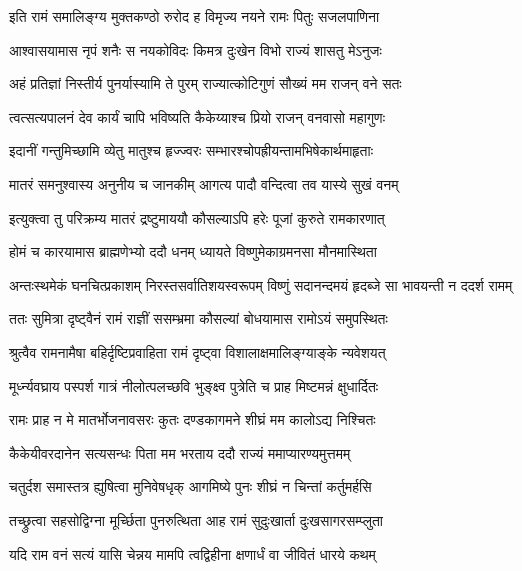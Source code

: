 \twolineshloka
{इति रामं समालिङ्ग्य मुक्तकण्ठो रुरोद ह}
{विमृज्य नयने रामः पितुः सजलपाणिना} %

\twolineshloka
{आश्वासयामास नृपं शनैः स नयकोविदः}
{किमत्र दुःखेन विभो राज्यं शासतु मेऽनुजः} %

\twolineshloka
{अहं प्रतिज्ञां निस्तीर्य पुनर्यास्यामि ते पुरम्}
{राज्यात्कोटिगुणं सौख्यं मम राजन् वने सतः} %

\twolineshloka
{त्वत्सत्यपालनं देव कार्यं चापि भविष्यति}
{कैकेय्याश्च प्रियो राजन् वनवासो महागुणः} %

\twolineshloka
{इदानीं गन्तुमिच्छामि व्येतु मातुश्च हृज्ज्वरः}
{सम्भारश्चोपह्रीयन्तामभिषेकार्थमाहृताः} %

\twolineshloka
{मातरं समनुश्वास्य अनुनीय च जानकीम्}
{आगत्य पादौ वन्दित्वा तव यास्ये सुखं वनम्} %

\twolineshloka
{इत्युक्त्वा तु परिक्रम्य मातरं द्रष्टुमाययौ}
{कौसल्याऽपि हरेः पूजां कुरुते रामकारणात्} %

\twolineshloka
{होमं च कारयामास ब्राह्मणेभ्यो ददौ धनम्}
{ध्यायते विष्णुमेकाग्रमनसा मौनमास्थिता} %

\fourlineindentedshloka
{अन्तःस्थमेकं घनचित्प्रकाशम्}
{निरस्तसर्वातिशयस्वरूपम्}
{विष्णुं सदानन्दमयं हृदब्जे}
{सा भावयन्ती न ददर्श रामम्} %





\twolineshloka
{ततः सुमित्रा दृष्ट्वैनं रामं राज्ञीं ससम्भ्रमा}
{कौसल्यां बोधयामास रामोऽयं समुपस्थितः} %

\twolineshloka
{श्रुत्वैव रामनामैषा बहिर्दृष्टिप्रवाहिता}
{रामं दृष्ट्वा विशालाक्षमालिङ्ग्याङ्के न्यवेशयत्} %

\twolineshloka
{मूर्ध्न्यवघ्राय पस्पर्श गात्रं नीलोत्पलच्छवि}
{भुङ्क्ष्व पुत्रेति च प्राह मिष्टमन्नं क्षुधार्दितः} %

\twolineshloka
{रामः प्राह न मे मातर्भोजनावसरः कुतः}
{दण्डकागमने शीघ्रं मम कालोऽद्य निश्चितः} %

\twolineshloka
{कैकेयीवरदानेन सत्यसन्धः पिता मम}
{भरताय ददौ राज्यं ममाप्यारण्यमुत्तमम्} %

\twolineshloka
{चतुर्दश समास्तत्र ह्युषित्वा मुनिवेषधृक्}
{आगमिष्ये पुनः शीघ्रं न चिन्तां कर्तुमर्हसि} %

\twolineshloka
{तच्छ्रुत्वा सहसोद्विग्ना मूर्च्छिता पुनरुत्थिता}
{आह रामं सुदुःखार्ता दुःखसागरसम्प्लुता} %

\twolineshloka
{यदि राम वनं सत्यं यासि चेन्नय मामपि}
{त्वद्विहीना क्षणार्धं वा जीवितं धारये कथम्} %

